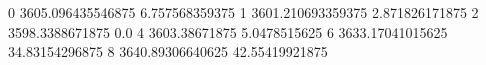 0 3605.096435546875 6.757568359375
1 3601.210693359375 2.871826171875
2 3598.3388671875 0.0
4 3603.38671875 5.0478515625
6 3633.17041015625 34.83154296875
8 3640.89306640625 42.55419921875
